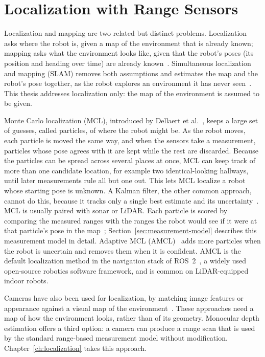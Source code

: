 \section{Localization with Range Sensors}
\label{sec:rw-loc}

Localization and mapping are two related but distinct problems. Localization asks where the robot
is, given a map of the environment that is already known; mapping asks what the environment looks
like, given that the robot's poses (its position and heading over time) are already
known~\cite{thrun2005probabilistic}. Simultaneous
localization and mapping (SLAM) removes both assumptions and estimates the map and the robot's pose
together, as the robot explores an environment it has never seen~\cite{durrantwhyte2006slam}.
This thesis addresses localization only: the map of the environment is assumed to be given.

Monte Carlo localization (MCL), introduced by Dellaert et al.~\cite{dellaert1999monte}, keeps a
large set of guesses, called particles, of where the robot might be. As the robot moves, each
particle is moved the same way, and when the sensors take a measurement, particles whose pose
agrees with it are kept while the rest are discarded.
Because the particles can be spread across several places at once, MCL can keep track of more than
one candidate location, for example two identical-looking hallways, until later measurements rule
all but one out. This lets MCL localize a robot whose starting pose is unknown. A Kalman filter,
the other common approach, cannot do this, because it tracks only a single best estimate and its
uncertainty~\cite{thrun2005probabilistic}.
MCL is usually paired with sonar or LiDAR. Each particle is scored by comparing the measured ranges
with the ranges the robot would see if it were at that particle's pose in the
map~\cite{thrun2005probabilistic}; Section~\ref{sec:measurement-model} describes this measurement
model in detail. Adaptive MCL (AMCL)~\cite{Fox2003KLD} adds more particles when the robot is
uncertain and removes them when it is confident. AMCL is the default localization method in the
navigation stack of ROS~2~\cite{Macenski2020Marathon2}, a widely used open-source robotics software
framework, and is common on LiDAR-equipped indoor robots.

Cameras have also been used for localization, by matching image features or appearance against a
visual map of the environment~\cite{dellaert1999condensation}.
These approaches need a map of how the environment looks, rather than of its geometry. Monocular
depth estimation offers a third option: a camera can produce a range scan that is used by the
standard range-based measurement model without modification. Chapter~\ref{ch:localization} takes this approach.

